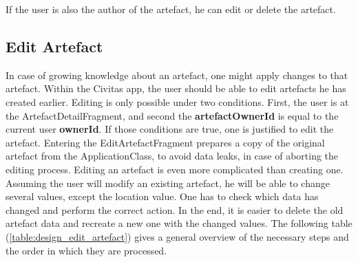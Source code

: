If the user is also the author of the artefact, he can edit or delete the artefact.

\subsection{Edit Artefact}
In case of growing knowledge about an artefact, one might apply changes to that artefact. Within the Civitas app, the user should be able to edit artefacts he has created earlier. Editing is only possible under two conditions. First, the user is at the ArtefactDetailFragment, and second the \textbf{artefactOwnerId} is equal to the current user \textbf{ownerId}\label{subsection:design_delete_artefact}. If those conditions are true, one is justified to edit the artefact. Entering the EditArtefactFragment prepares a copy of the original artefact from the ApplicationClass, to avoid data leaks, in case of aborting the editing process. 
Editing an artefact is even more complicated than creating one. Assuming the user will modify an existing artefact, he will be able to change several values, except the location value. 
One has to check which data has changed and perform the correct action. In the end, it is easier to delete the old artefact data and recreate a new one with the changed values. 
The following table (\ref{table:design_edit_artefact}) gives a general overview of the necessary steps and the order in which they are processed.

